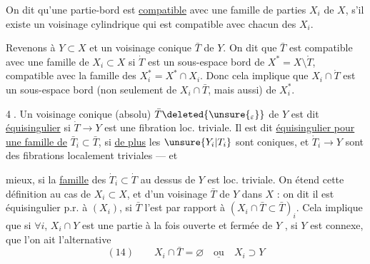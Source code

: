 On dit qu'une partie-bord  est \uline{compatible} avec
une famille de parties $X_i$ de $X$, s'il
existe un voisinage cylindrique qui est
compatible  avec chacun des $X_i$.

Revenons à $Y\subset X$ et un voisinage
conique  $\bar T$ de $Y$. On dit que $\bar T$ est
 compatible avec une famille de $X_i\subset X$
si 
$\dot T$ est un sous-espace bord de
$X^*=X\setminus\mathring T$, compatible avec la famille des
$X_i^*=X^*\cap X_i$. Donc cela implique que
$X_i\cap\dot T$ est un sous-espace bord (non seulement
de $X_i\cap\bar T$, mais aussi) de $X_i^*$.

\textcircled{4}.  Un voisinage conique (absolu)
$\bar T\deleted{\unsure{_\varepsilon}}$ de
$Y$ est dit \uline{équisingulier} si $\dot T\longrightarrow Y$ est une
fibration loc. triviale. Il est dit \uline{équisingulier
pour une famille de} $\bar T_i\subset\bar T$, si \uline{de plus}
les $\unsure{Y_i|T_i}$ sont coniques, et $\dot T_i\longrightarrow Y$ sont des
fibrations localement triviales --- et 

mieux, si la \uline{famille} des $\dot T_i\subset\dot T$ au dessus
de $Y$ est  loc. triviale. On étend cette
définition au cas de $X_i\subset X$, et d'un
voisinage  $\bar T$ de $Y$ dans $X$ :
on dit
il est équisingulier p.r. à $(X_i)$, si $\bar T$
l'est par rapport à $(X_i\cap\bar T\subset\bar T)_i$.
Cela
implique  que si $\forall i$, $X_i\cap Y$ est une
partie à la fois ouverte et fermée de $Y$
, si $Y$ est connexe, que 
l'on ait l'alternative
\[
(14)\qquad X_i\cap\bar T=\varnothing\quad\underline{\text{ou}}\quad X_i\supset Y
\]
\margin{on dit qu'il est \uline{strictement équisingulier}
si de plus il est \uline{strictement} \unsure{compatible avec tous}
les $X_i$.
Si $\bar T$ équisingulier p.r. à $(X_i)$,
$\lambda\bar T$ l'est strictement pour $\lambda\in]0,1[$.}

